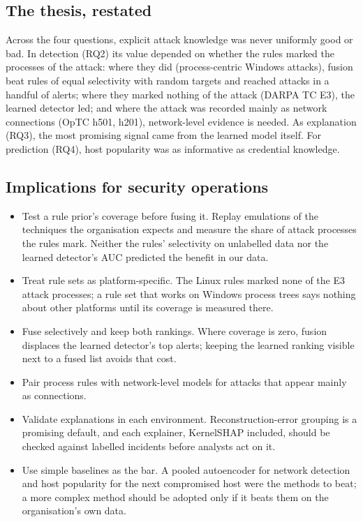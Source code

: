 \documentclass[acmlarge,screen,review]{acmart}
\begin{document}
\subsection{The thesis, restated}
Across the four questions, explicit attack knowledge was never uniformly good or bad. In detection (RQ2) its value
depended on whether the rules marked the processes of the attack: where they did (process-centric Windows attacks),
fusion beat rules of equal selectivity with random targets and reached attacks in a handful of alerts; where they
marked nothing of the attack (DARPA TC E3), the learned detector led; and where the attack was recorded mainly as
network connections (OpTC h501, h201), network-level evidence is needed. As explanation (RQ3), the most promising
signal came from the learned model itself. For prediction (RQ4), host popularity was as informative as credential
knowledge.

\subsection{Implications for security operations}
\begin{itemize}
\item Test a rule prior's coverage before fusing it. Replay emulations of the techniques the organisation
expects and measure the share of attack processes the rules mark. Neither the rules' selectivity on unlabelled data
nor the learned detector's AUC predicted the benefit in our data.
\item Treat rule sets as platform-specific. The Linux rules marked none of the E3 attack processes; a rule set
that works on Windows process trees says nothing about other platforms until its coverage is measured there.
\item Fuse selectively and keep both rankings. Where coverage is zero, fusion displaces the learned detector's
top alerts; keeping the learned ranking visible next to a fused list avoids that cost.
\item Pair process rules with network-level models for attacks that appear mainly as connections.
\item Validate explanations in each environment. Reconstruction-error grouping is a promising default, and each
explainer, KernelSHAP included, should be checked against labelled incidents before analysts act on it.
\item Use simple baselines as the bar. A pooled autoencoder for network detection and host popularity for the
next compromised host were the methods to beat; a more complex method should be adopted only if it beats them on the
organisation's own data.
\end{itemize}
\end{document}
